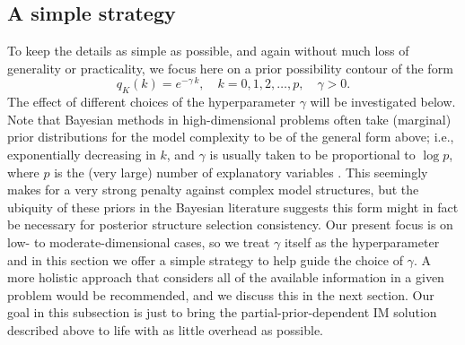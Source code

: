 \documentclass[12pt]{article}
\begin{document}



\subsection{A simple strategy}
\label{SS:simple.strategy}

To keep the details as simple as possible, and again without much loss of generality or practicality, we focus here on a prior possibility contour of the form
\begin{equation}
\label{eq:contour.gamma}
q_K(k) = e^{-\gamma \, k}, \quad k=0,1,2,\ldots,p, \quad \gamma > 0. 
\end{equation}
The effect of different choices of the hyperparameter $\gamma$ will be investigated below.  Note that Bayesian methods in high-dimensional problems often take (marginal) prior distributions for the model complexity to be of the general form above; i.e., exponentially decreasing in $k$, and $\gamma$ is usually taken to be proportional to $\log p$, where $p$ is the (very large) number of explanatory variables \citep[see, e.g.,][]{castillo2015bayesian, martin.mess.walker.eb, belitser.ghosal.ebuq}.  This seemingly makes for a very strong penalty against complex model structures, but the ubiquity of these priors in the Bayesian literature suggests this form might in fact be necessary for posterior structure selection consistency.  Our present focus is on low- to moderate-dimensional cases, so we treat $\gamma$ itself as the hyperparameter and in this section we offer a simple strategy to help guide the choice of $\gamma$.  A more holistic approach that considers all of the available information in a given problem would be recommended, and we discuss this in the next section.  Our goal in this subsection is just to bring the partial-prior-dependent IM solution described above to life with as little overhead as possible.  
\end{document}
